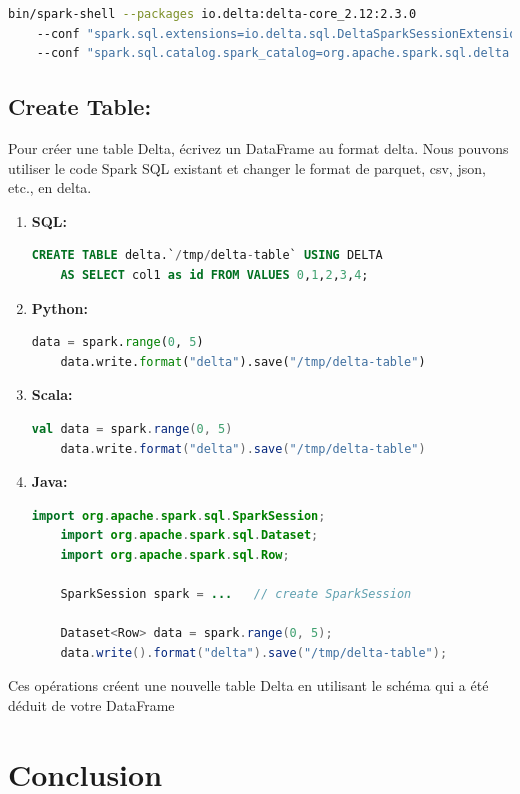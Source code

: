\begin{lstlisting}[language=bash]
    bin/spark-shell --packages io.delta:delta-core_2.12:2.3.0 
    --conf "spark.sql.extensions=io.delta.sql.DeltaSparkSessionExtension" 
    --conf "spark.sql.catalog.spark_catalog=org.apache.spark.sql.delta.catalog.DeltaCatalog"
\end{lstlisting}

\subsection*{Create Table:}
Pour créer une table Delta, écrivez un DataFrame au format delta. Nous pouvons utiliser le code Spark SQL existant et changer le format de parquet, csv, json, etc., en delta.

\begin{enumerate}
    \item \textbf{SQL:}
    \begin{lstlisting}[language=sql]
    CREATE TABLE delta.`/tmp/delta-table` USING DELTA
    AS SELECT col1 as id FROM VALUES 0,1,2,3,4;
    \end{lstlisting}
    \item \textbf{Python:}
    \begin{lstlisting}[language=python]
    data = spark.range(0, 5)
    data.write.format("delta").save("/tmp/delta-table")
    \end{lstlisting}
    \item \textbf{Scala:}
    \begin{lstlisting}[language=scala]
    val data = spark.range(0, 5)
    data.write.format("delta").save("/tmp/delta-table")
    \end{lstlisting}
    \item \textbf{Java:}
    \begin{lstlisting}[language=java]
    import org.apache.spark.sql.SparkSession;
    import org.apache.spark.sql.Dataset;
    import org.apache.spark.sql.Row;
    
    SparkSession spark = ...   // create SparkSession
    
    Dataset<Row> data = spark.range(0, 5);
    data.write().format("delta").save("/tmp/delta-table");
    \end{lstlisting}
\end{enumerate}

Ces opérations créent une nouvelle table Delta en utilisant le schéma qui a été déduit de votre DataFrame
\section*{Conclusion}

